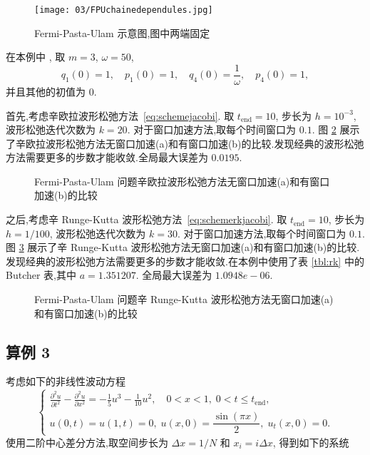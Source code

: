 \begin{figure}[h!]
  \centering
  \texttt{[image: 03/FPUchainedependules.jpg]}
  \caption{Fermi-Pasta-Ulam 示意图,图中两端固定}
  \label{fig:fpu}
\end{figure}

在本例中 \cite{hairer2006geometric}, 取 $m=3$, $\omega = 50$,
\begin{equation*}
  q_1(0) = 1, \quad p_1(0) = 1, \quad q_4(0) = \frac{1}{\omega}, \quad p_4(0) = 1,
\end{equation*}
并且其他的初值为 $0$.

首先,考虑辛欧拉波形松弛方法~\eqref{eq:schemejacobi}. 取 $t_{\text{end}} = 10$, 步长为 $h = 10^{-3}$, 波形松弛迭代次数为 $k=20$. 对于窗口加速方法,取每个时间窗口为 $0.1$. 图 \ref{fig:ex2seucom} 展示了辛欧拉波形松弛方法无窗口加速(a)和有窗口加速(b)的比较.发现经典的波形松弛方法需要更多的步数才能收敛.全局最大误差为 $0.0195$.

\begin{figure}[h!]
  \centering
  \caption{Fermi-Pasta-Ulam 问题辛欧拉波形松弛方法无窗口加速(a)和有窗口加速(b)的比较}
  \label{fig:ex2seucom}
\end{figure}

之后,考虑辛 Runge-Kutta 波形松弛方法~\eqref{eq:schemerkjacobi}. 取 $t_{\text{end}} = 10$, 步长为 $h = 1/100$, 波形松弛迭代次数为 $k=30$. 对于窗口加速方法,取每个时间窗口为 $0.1$. 图 \ref{fig:ex2srkcom} 展示了辛 Runge-Kutta 波形松弛方法无窗口加速(a)和有窗口加速(b)的比较.发现经典的波形松弛方法需要更多的步数才能收敛.在本例中使用了表 \ref{tbl:rk} 中的 Butcher 表,其中 $a = 1.351207$. 全局最大误差为 $1.0948e-06$.

\begin{figure}[h!]
  \centering
  \caption{Fermi-Pasta-Ulam 问题辛 Runge-Kutta 波形松弛方法无窗口加速(a)和有窗口加速(b)的比较}
  \label{fig:ex2srkcom}
\end{figure}

\subsection*{算例 3}
考虑如下的非线性波动方程 \cite{wu2013struc}
\begin{equation}\label{eq:nonlinwave}
  \left \{ \begin{array}{l}
      \displaystyle \frac{\partial^2 u }{\partial t^2}
      - \frac{\partial^2 u}{\partial x^2}
      = -\frac{1}{5} u^3 - \frac{1}{10} u^2, \quad 0<x<1, \; 0<t \leq t_{\text{end}},\\
      u(0,t) = u(1,t) = 0, \; u(x, 0) = \dfrac{\sin(\pi x)}{2}, \; u_t (x, 0) = 0.
    \end{array} \right.
\end{equation}
使用二阶中心差分方法,取空间步长为 $\Delta x = 1/N$ 和 $x_i = i \Delta x$, 得到如下的系统

